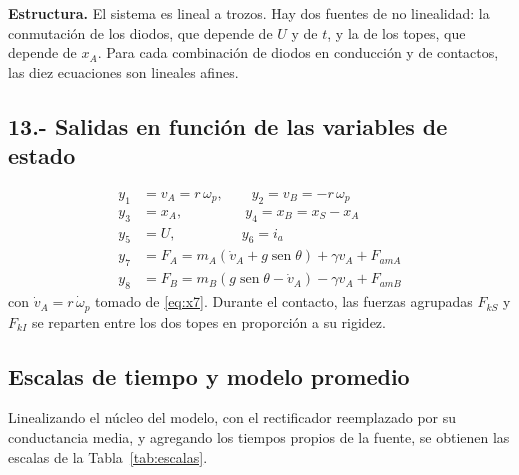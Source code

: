 \documentclass[10pt,a4paper,twocolumn]{article}
\DeclareMathOperator{\sen}{sen}
\begin{document}
\noindent\textbf{Estructura.} El sistema es lineal a trozos. Hay dos fuentes de no
linealidad: la conmutación de los diodos, que depende de $U$ y de $t$, y la de los topes,
que depende de $x_A$. Para cada combinación de diodos en conducción y de contactos, las diez
ecuaciones son lineales afines.

\subsection*{13.- Salidas en función de las variables de estado}
\begin{align}
  y_1 &= v_A = r\,\omega_p, \qquad y_2 = v_B = -r\,\omega_p \tag{13.1}\\
  y_3 &= x_A, \qquad\qquad\ \ y_4 = x_B = x_S - x_A \tag{13.2}\\
  y_5 &= U, \qquad\qquad\ \ \ y_6 = i_a \tag{13.3}\\
  y_7 &= F_A = m_A(\dot v_A + g\sen\theta) + \gamma v_A + F_{amA} \tag{13.4}\\
  y_8 &= F_B = m_B(g\sen\theta - \dot v_A) - \gamma v_A + F_{amB} \tag{13.5}
\end{align}
con $\dot v_A = r\,\dot\omega_p$ tomado de \eqref{eq:x7}. Durante el contacto, las fuerzas
agrupadas $F_{kS}$ y $F_{kI}$ se reparten entre los dos topes en proporción a su rigidez.

\subsection*{Escalas de tiempo y modelo promedio}

Linealizando el núcleo del modelo, con el rectificador reemplazado por su conductancia
media, y agregando los tiempos propios de la fuente, se obtienen las escalas de la
Tabla~\ref{tab:escalas}.
\end{document}
